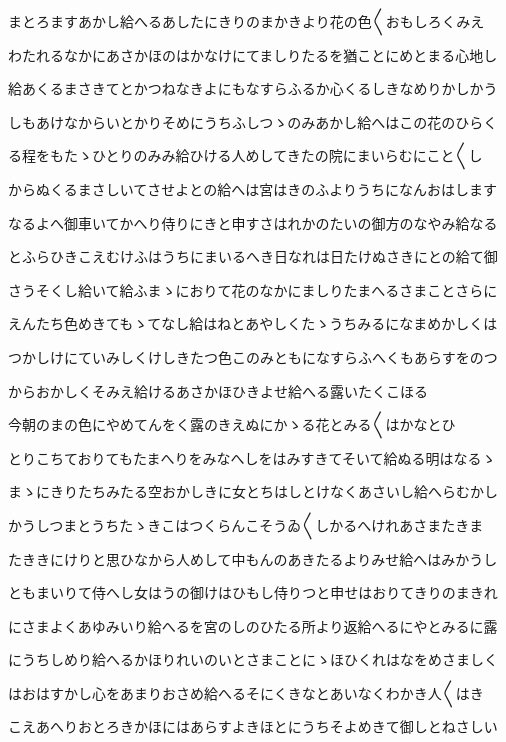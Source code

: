 \documentclass[a4paper,11pt,landscape]{ltjtarticle}
\begin{document}
まとろますあかし給へるあしたにきりのまかきより花の色〱おもしろくみえ
\par\medskip
わたれるなかにあさかほのはかなけにてましりたるを猶ことにめとまる心地し
\par\medskip
給あくるまさきてとかつねなきよにもなすらふるか心くるしきなめりかしかう
\par\medskip
しもあけなからいとかりそめにうちふしつゝのみあかし給へはこの花のひらく
\par\medskip
る程をもたゝひとりのみみ給ひける人めしてきたの院にまいらむにこと〱し
\par\medskip
からぬくるまさしいてさせよとの給へは宮はきのふよりうちになんおはします
\par\medskip
なるよへ御車いてかへり侍りにきと申すさはれかのたいの御方のなやみ給なる
\par\medskip
とふらひきこえむけふはうちにまいるへき日なれは日たけぬさきにとの給て御
\par\medskip
さうそくし給いて給ふまゝにおりて花のなかにましりたまへるさまことさらに
\par\medskip
えんたち色めきてもゝてなし給はねとあやしくたゝうちみるになまめかしくは
\par\medskip
つかしけにていみしくけしきたつ色このみともになすらふへくもあらすをのつ
\par\medskip
からおかしくそみえ給けるあさかほひきよせ給へる露いたくこほる
\par\medskip
今朝のまの色にやめてんをく露のきえぬにかゝる花とみる〱はかなとひ
\par\medskip
とりこちておりてもたまへりをみなへしをはみすきてそいて給ぬる明はなるゝ
\par\medskip
まゝにきりたちみたる空おかしきに女とちはしとけなくあさいし給へらむかし
\par\medskip
かうしつまとうちたゝきこはつくらんこそうゐ〱しかるへけれあさまたきま
\par\medskip
たききにけりと思ひなから人めして中もんのあきたるよりみせ給へはみかうし
\par\medskip
ともまいりて侍へし女はうの御けはひもし侍りつと申せはおりてきりのまきれ
\par\medskip
にさまよくあゆみいり給へるを宮のしのひたる所より返給へるにやとみるに露
\par\medskip
にうちしめり給へるかほりれいのいとさまことにゝほひくれはなをめさましく
\par\medskip
はおはすかし心をあまりおさめ給へるそにくきなとあいなくわかき人〱はき
\par\medskip
こえあへりおとろきかほにはあらすよきほとにうちそよめきて御しとねさしい
\end{document}
